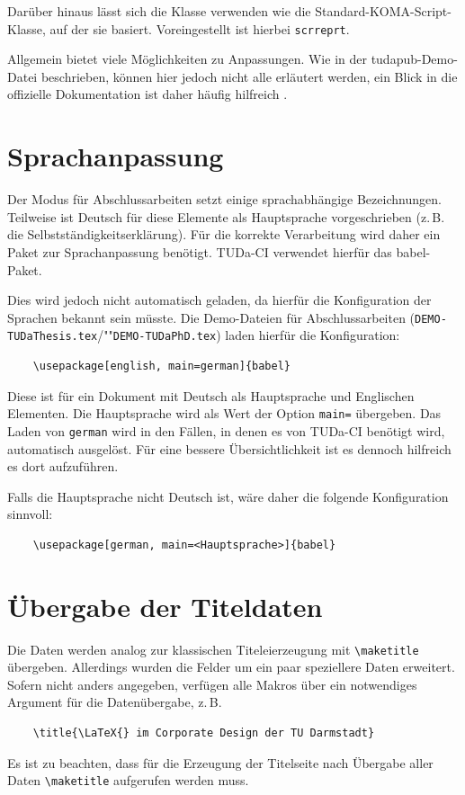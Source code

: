 \documentclass[
	ngerman,%
	accentcolor=9c,%
	ruledheaders=section,%
	class=report,%
	thesis={type=bachelor},%
	fontsize=11pt,%
	parskip=half-,%
	custommargins=true,%
	marginpar=false,%
]{tudapub}
\newcommand*{\file}[1]{\texttt{#1}}
\newcommand*{\code}[1]{\texttt{#1}}
\begin{document}
Darüber hinaus lässt sich die Klasse verwenden wie die Standard-KOMA-Script-Klasse, auf der sie basiert.
Voreingestellt ist hierbei \code{scrreprt}.

Allgemein bietet \KOMAScript{} viele Möglichkeiten zu Anpassungen. Wie in der tudapub-Demo-Datei beschrieben, können hier jedoch nicht alle erläutert werden, ein Blick in die offizielle Dokumentation ist daher häufig hilfreich \cite{scrguide}.

\section{Sprachanpassung}
Der Modus für Abschlussarbeiten setzt einige sprachabhängige Bezeichnungen.
Teilweise ist Deutsch für diese Elemente als Hauptsprache vorgeschrieben (z.\,B. die Selbstständigkeitserklärung). Für die korrekte Verarbeitung wird daher ein Paket zur Sprachanpassung benötigt.
TUDa-CI verwendet hierfür das babel-Paket.

Dies wird jedoch nicht automatisch geladen, da hierfür die Konfiguration der Sprachen bekannt sein müsste. Die Demo-Dateien für Abschlussarbeiten (\file{DEMO-TUDaThesis.tex}/""\file{DEMO-TUDaPhD.tex}) laden hierfür die Konfiguration:
\begin{verbatim}
    \usepackage[english, main=german]{babel}
\end{verbatim}
Diese ist für ein Dokument mit Deutsch als Hauptsprache und Englischen Elementen.
Die Hauptsprache wird als Wert der Option \verb+main=+ übergeben.
Das Laden von \verb+german+ wird in den Fällen, in denen es von TUDa-CI benötigt wird, automatisch ausgelöst.
Für eine bessere Übersichtlichkeit ist es dennoch hilfreich es dort aufzuführen.

Falls die Hauptsprache nicht Deutsch ist, wäre daher die folgende Konfiguration sinnvoll:
\begin{verbatim}
    \usepackage[german, main=<Hauptsprache>]{babel}
\end{verbatim}

\section{Übergabe der Titeldaten}

Die Daten werden analog zur klassischen Titeleierzeugung mit \verb+\maketitle+ übergeben. Allerdings wurden die Felder um ein paar speziellere Daten erweitert. Sofern nicht anders angegeben, verfügen alle Makros über ein notwendiges Argument für die Datenübergabe, z.\,B.
\begin{verbatim}
    \title{\LaTeX{} im Corporate Design der TU Darmstadt}
\end{verbatim}
Es ist zu beachten, dass für die Erzeugung der Titelseite nach Übergabe aller Daten \verb+\maketitle+ aufgerufen werden muss.
\end{document}
